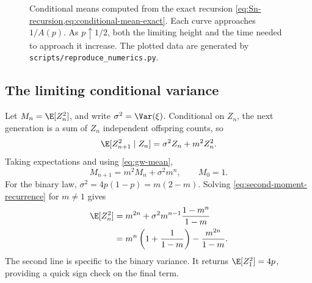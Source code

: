 \begin{figure}[htbp]
\centering
{}
\caption{Conditional means computed from the exact recursion
\cref{eq:Sn-recursion,eq:conditional-mean-exact}.  Each curve approaches \(1/A(p)\).
As \(p\uparrow1/2\), both the limiting height and the time needed to approach it
increase.  The plotted data are generated by
\texttt{scripts/reproduce\_numerics.py}.}
\label{fig:conditional-means}
\end{figure}

\subsection{The limiting conditional variance}
\label{sec:qsd-variance}

Let \(M_n=\E[Z_n^2]\), and write \(\sigma^2=\Var(\xi)\).  Conditional on \(Z_n\),
the next generation is a sum of \(Z_n\) independent offspring counts, so
\begin{equation}
  \E[Z_{n+1}^2\mid Z_n]
  =\sigma^2Z_n+m^2Z_n^2.
\end{equation}
Taking expectations and using \cref{eq:gw-mean},
\begin{equation}
  M_{n+1}=m^2M_n+\sigma^2m^n,
  \qquad M_0=1.
  \label{eq:second-moment-recurrence}
\end{equation}
For the binary law, \(\sigma^2=4p(1-p)=m(2-m)\).  Solving
\cref{eq:second-moment-recurrence} for \(m\neq1\) gives
\begin{align}
  \E[Z_n^2]
  &=m^{2n}+\sigma^2m^{n-1}\frac{1-m^n}{1-m}
  \notag\\
  &=m^n\left(1+\frac{1}{1-m}\right)
    -\frac{m^{2n}}{1-m}.
  \label{eq:binary-second-moment}
\end{align}
The second line is specific to the binary variance.  It returns
\(\E[Z_1^2]=4p\), providing a quick sign check on the final term.

